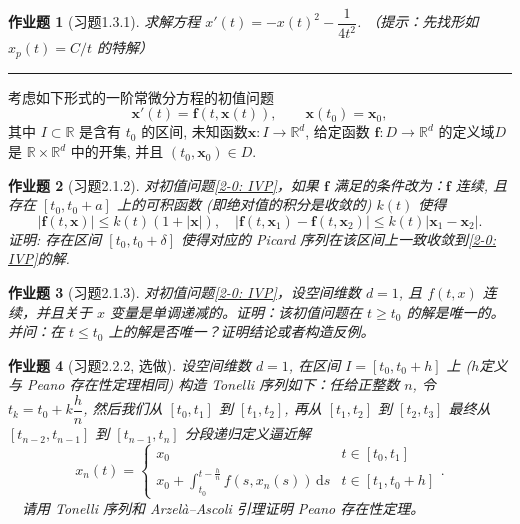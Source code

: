 \documentclass[UTF8,fontset=windows,12pt]{ctexart}
\theoremstyle{kaiti-theorem}
\newtheorem{problem}{作业题}
\numberwithin{equation}{section}
\newcommand{\R}{\mathbb{R}}
\newcommand{\bds}[1]{\boldsymbol{#1}}  %
\newcommand{\ds}{\,\mathrm{d}s}
\newcommand{\xx}{{\bds{x}}}
\newcommand{\ff}{\bds{f}}
\begin{document}
\begin{problem}[习题1.3.1]
求解方程 $x'(t)=-x(t)^2-\dfrac{1}{4t^2}$. （提示：先找形如 $x_p(t)=C/t$ 的特解）
\end{problem}

\bigskip \hrule \bigskip

考虑如下形式的一阶常微分方程的初值问题
\begin{equation}\label{2-0: IVP}\tag{2.0.1}
 \xx'(t)=\ff(t, \xx(t)), \qquad \xx(t_0)=\xx_0, 
\end{equation}
其中 \(I\subset\R\) 是含有 \(t_0\) 的区间, 未知函数\(\xx:I\to\R^d\), 给定函数 \(\ff:D\to\R^d\) 的定义域\(D\) 是 \(\R\times\R^d\) 中的开集, 并且 \((t_0, \xx_0)\in D\). 

\begin{problem}[习题2.1.2]
对初值问题\eqref{2-0: IVP}，如果 $\ff$ 满足的条件改为：$\ff$ 连续, 且存在 $[t_0,t_0+a]$ 上的可积函数 (即绝对值的积分是收敛的) $k(t)$ 使得
\[
|\ff(t,\xx)|\leqslant k(t)(1+|\xx|),\quad |\ff(t,\xx_1)-\ff(t,\xx_2)|\leqslant k(t)|\xx_1-\xx_2|.
\] 证明: 存在区间 $[t_0,t_0+\delta]$ 使得对应的 Picard 序列在该区间上一致收敛到\eqref{2-0: IVP}的解.
\end{problem}

\begin{problem}[习题2.1.3] 
对初值问题\eqref{2-0: IVP}，设空间维数 $d=1$, 且 $f(t,x)$ 连续，并且关于 $x$ 变量是单调递减的。证明：该初值问题在 $t\geqslant t_0$ 的解是唯一的。并问：在 $t\leqslant t_0$ 上的解是否唯一？证明结论或者构造反例。
\end{problem}

\begin{problem}[习题2.2.2, 选做]
设空间维数 $d=1$, 在区间 $I=[t_0,t_0+h]$ 上 ($h$定义与 Peano 存在性定理相同) 构造 Tonelli 序列如下：任给正整数 $n$, 令 $t_k=t_0+k\dfrac{h}{n}$, 然后我们从 $[t_0,t_1]$ 到 $[t_1,t_2]$, 再从 $[t_1,t_2]$ 到 $[t_2,t_3]$ 最终从 $[t_{n-2},t_{n-1}]$ 到 $[t_{n-1},t_n]$ 分段递归定义逼近解
\[
x_n(t)=\begin{cases}
x_0& t\in[t_0,t_1]\\
x_0+\int_{t_0}^{t-\frac{h}{n}} f(s,x_n(s))\ds&t\in[t_1,t_0+h]
\end{cases}.
\]　请用 Tonelli 序列和 Arzel\`a--Ascoli 引理证明 Peano 存在性定理。
\end{problem}
\end{document}
